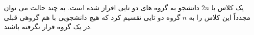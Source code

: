 \exercise
 یک کلاس با 
$2n$
  دانشجو به گروه های دو تایی افراز شده است. به چند حالت می توان مجدداً این کلاس را به 
$n$
   گروه دو تایی تقسیم کرد که هیچ دانشجویی با هم گروهی قبلی در یک گروه قرار نگرفته باشند.